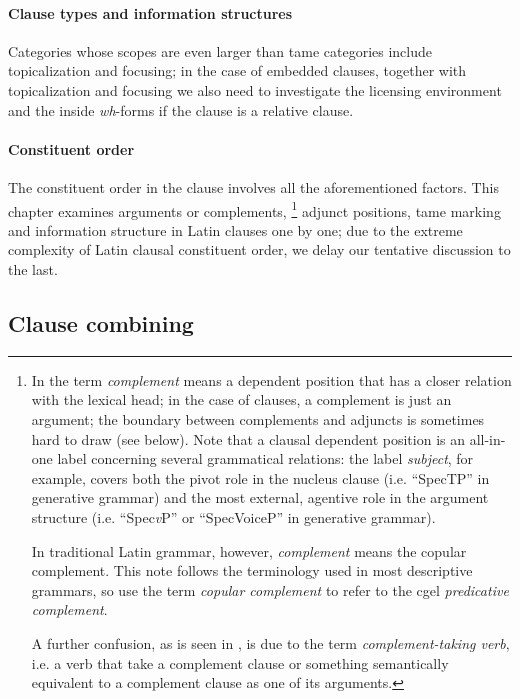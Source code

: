 \documentclass[a4paper, oneside, 12pt]{report}
\newcommand*{\term}[1]{\emph{#1}}
\newcommand{\form}[1]{\emph{#1}}
\newcommand{\vP}{\textit{v}P}
\begin{document}
\paragraph*{Clause types and information structures} Categories whose scopes are even larger than \ac{tame} categories include topicalization and focusing;
in the case of embedded clauses, 
together with topicalization and focusing 
we also need to investigate the licensing environment
and the inside \form{wh}-forms if the clause is a relative clause.

\paragraph*{Constituent order} 
The constituent order in the clause involves all the aforementioned factors.
This chapter examines arguments or complements,
\footnote{
    In \citet{cgel} the term \term{complement} means a 
    dependent position that has a closer relation with the lexical head;
    in the case of clauses, a complement is just an argument;
    the boundary between complements and adjuncts is sometimes hard to draw (see below).    
    Note that a clausal dependent position is 
    an all-in-one label concerning several grammatical relations:
    the label \term{subject}, for example, 
    covers both the pivot role in the nucleus clause 
    (i.e. ``SpecTP'' in generative grammar) 
    and the most external, agentive role in the argument structure
    (i.e. ``Spec\vP'' or ``SpecVoiceP'' in generative grammar).

    In traditional Latin grammar, however, \term{complement} means the copular complement. 
    This note follows the terminology used in most descriptive grammars,
    so use the term \term{copular complement} to refer to the \ac{cgel} \term{predicative complement}.

    A further confusion, as is seen in , 
    is due to the term \term{complement-taking verb}, 
    i.e. a verb that take a complement clause 
    or something semantically equivalent to a complement clause
    as one of its arguments.
}
adjunct positions, \ac{tame} marking and information structure in Latin clauses one by one;
due to the extreme complexity of Latin clausal constituent order, 
we delay our tentative discussion to the last.

\subsection{Clause combining}
\end{document}
